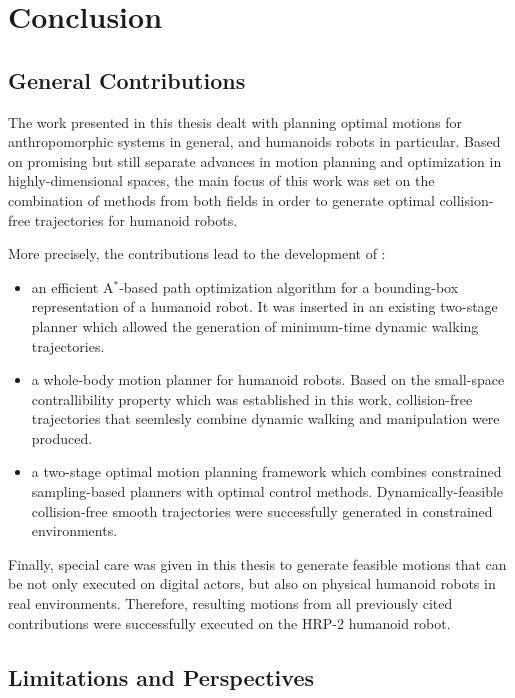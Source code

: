 \chapter{Conclusion}
\label{chap:conclusion}

\section{General Contributions}

The work presented in this thesis dealt with planning optimal motions
for anthropomorphic systems in general, and humanoids robots in
particular. Based on promising but still separate advances in
motion planning and optimization in highly-dimensional spaces, the
main focus of this work was set on the combination of methods from
both fields in order to generate optimal collision-free trajectories
for humanoid robots. 

More precisely, the contributions lead to the development of :
\begin{itemize}
\item an efficient A$^*$-based path optimization algorithm for a
  bounding-box representation of a humanoid robot. It was inserted in
  an existing two-stage planner which allowed the generation of
  minimum-time dynamic walking trajectories.
\item a whole-body motion planner for humanoid robots. Based on the
  small-space contrallibility property which was established in this
  work, collision-free trajectories that seemlesly combine dynamic
  walking and manipulation were produced.
\item a two-stage optimal motion planning framework which combines
  constrained sampling-based planners with optimal control
  methods. Dynamically-feasible collision-free smooth trajectories
  were successfully generated in constrained environments.
\end{itemize}

Finally, special care was given in this thesis to generate feasible
motions that can be not only executed on digital actors, but also on
physical humanoid robots in real environments. Therefore, resulting
motions from all previously cited contributions were successfully
executed on the HRP-2 humanoid robot.

\section{Limitations and Perspectives}

